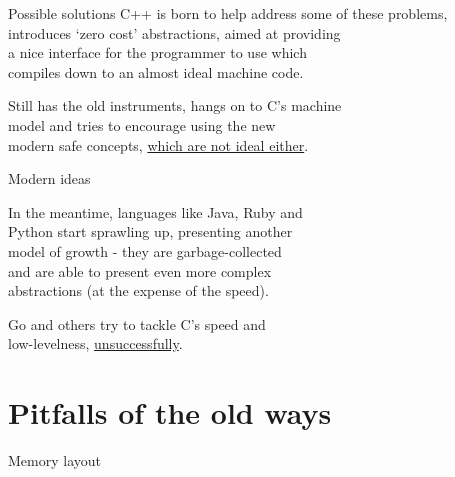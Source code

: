 \documentclass[usenames,dvipsnames,10pt,aspectratio=169]{beamer}
\begin{document}
\begin{frame}{Possible solutions}
\large
C++ is born to help address some of these problems,\\ 
introduces ‘zero cost’ abstractions, aimed at providing\\
a nice interface for the programmer to use which\\
compiles down to an almost ideal machine code.
\vspace{0.5cm}

Still has the old instruments, hangs on to C's machine\\
model %
and tries to encourage using the new\\ 
modern safe concepts, 
\href{https://alexgaynor.net/2019/apr/21/modern-c++-wont-save-us/}
{which are not ideal either}.


\end{frame}

\begin{frame}{Modern ideas}

\large
In the meantime, languages like Java, Ruby and\\
Python start sprawling up, presenting another\\
model of growth - they are garbage-collected\\
and are able to present even more complex\\
abstractions (at the expense of the speed).\\

\vspace{0.5cm}

Go and others try to tackle C's speed and\\
low-levelness, 
\href{https://cowlark.com/2009-11-15-go/}{unsuccessfully}.

\end{frame}


\section{Pitfalls of the old ways}

\begin{frame}{Memory layout} 
\inputminted[fontsize=\large]{c}{code/stack.c}
\end{frame}
\end{document}
